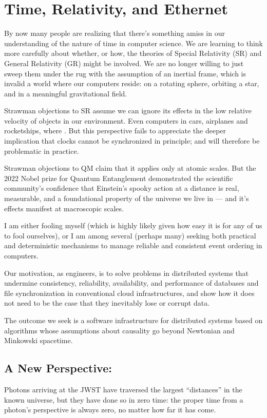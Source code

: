 \documentclass[../../../OAE-SPEC-MAIN.tex]{subfiles}
\begin{document}
\section{Time, Relativity, and Ethernet}
By now many people are realizing that there’s something amiss in our understanding of the nature of time in computer science. We are learning to think more carefully about whether, or how, the theories of Special Relativity (SR) and General Relativity (GR) might be involved. We are no longer willing to just sweep them under the rug with the assumption of an inertial frame, which is invalid a world where our computers reside: on a rotating sphere, orbiting a star, and in a meaningful gravitational field.

Strawman objections to SR assume we can ignore its effects in the low relative velocity of objects in our environment. Even computers in cars, airplanes and rocketships, where .  But this perspective fails to appreciate the deeper implication that clocks cannot be synchronized in principle; and will therefore be problematic in practice.

Strawman objections to QM claim that it applies only at atomic scales. But the 2022 Nobel prize for Quantum Entanglement demonstrated the scientific community’s confidence that Einstein’s spooky action at a distance is real, measurable, and a foundational property of the universe we live in — and it’s effects manifest at macroscopic scales.

I am either fooling myself (which is highly likely given how easy it is for any of us to fool ourselves), or I am among several (perhaps many) seeking both practical and deterministic mechanisms to manage reliable and consistent event ordering in computers.

Our motivation, as engineers, is to solve problems in distributed systems that undermine consistency, reliability, availability, and performance of databases and file synchronization in conventional cloud infrastructures, and show how it does not need to be the case that they inevitably lose or corrupt data.

The outcome we seek is a software infrastructure for distributed systems based on algorithms whose assumptions about causality go beyond Newtonian and Minkowski spacetime.


\subsection{A New Perspective:}
Photons arriving at the JWST have traversed the largest “distances” in the known universe, but they have done so in zero time: the proper time from a photon’s perspective is always zero, no matter how far it has come. 
\end{document}
